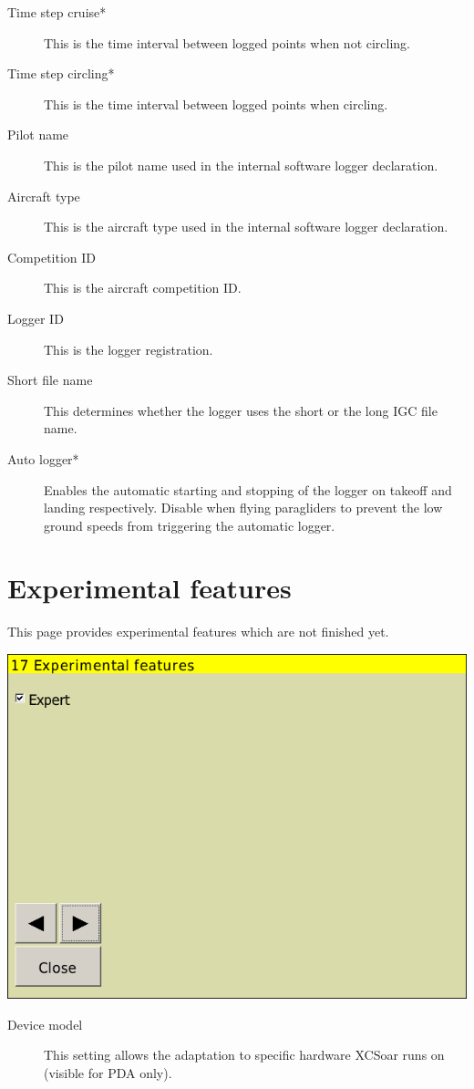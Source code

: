 \begin{description}
\item[Time step cruise*]  This is the time interval between logged points when not circling. 
\item[Time step circling*]  This is the time interval between logged points when circling. 
\item[Pilot name]  This is the pilot name used in the internal software logger declaration.
\item[Aircraft type]  This is the aircraft type used in the internal software logger declaration.
\item[Competition ID]  This is the aircraft competition ID.
\item[Logger ID]  This is the logger registration.
\item[Short file name]  This determines whether the logger uses the short or the long IGC file name.
\item[Auto logger*]  Enables the automatic starting and stopping of the logger
on takeoff and landing respectively. Disable when flying paragliders to prevent the low ground speeds from
triggering the automatic logger.
\end{description}


\clearpage
\section{Experimental features}

This page provides experimental features which are not finished yet.

\begin{center}
\includegraphics[angle=0,width=0.8\linewidth,keepaspectratio='true']{figures/config-exp.png}
\end{center}

\begin{description}
\item[Device model] This setting allows the adaptation to specific hardware
XCSoar runs on (visible for PDA only).
\end{description}
